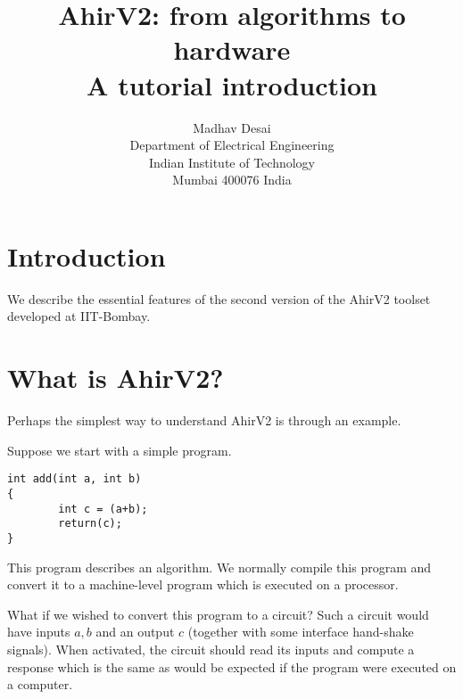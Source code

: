 \documentclass{article}
\title{AhirV2: from algorithms to hardware \\ A tutorial introduction}
\author{Madhav Desai \\ Department of Electrical Engineering \\ Indian Institute of Technology \\
	Mumbai 400076 India}
\begin{document}
\maketitle

\section{Introduction}

We describe the essential features
of the second version of the AhirV2 toolset
developed at IIT-Bombay.

\section{What is AhirV2?}

Perhaps the simplest way to understand AhirV2 is
through an example.

Suppose we start with a simple program.
\begin{verbatim}
int add(int a, int b)
{
        int c = (a+b);
        return(c);
}
\end{verbatim}
This program describes an algorithm.  We normally
compile this program and convert it to a machine-level
program which is executed on a processor.

What if we wished to convert this program to
a circuit?  
Such a circuit would have inputs 
$a,b$ and an output $c$ (together with some
interface hand-shake signals).  When activated,
the circuit should read its inputs and compute 
a response which is the same as would be expected
if the program were executed on a computer.
\end{document}
